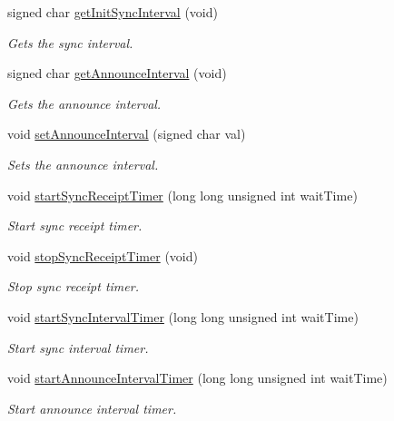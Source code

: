 \begin{DoxyCompactItemize}
signed char \hyperlink{class_common_port_af10585c4e9853d5a958933d5c5357445}{get\+Init\+Sync\+Interval} (void)
\begin{DoxyCompactList}\small\item\em Gets the sync interval. \end{DoxyCompactList}\item 
signed char \hyperlink{class_common_port_a7aa1a5fddf7129f600c97c018087b7b8}{get\+Announce\+Interval} (void)
\begin{DoxyCompactList}\small\item\em Gets the announce interval. \end{DoxyCompactList}\item 
void \hyperlink{class_common_port_a55a6b4ff487cd157501f921a27db0d9c}{set\+Announce\+Interval} (signed char val)
\begin{DoxyCompactList}\small\item\em Sets the announce interval. \end{DoxyCompactList}\item 
void \hyperlink{class_common_port_a25bf37b5026e4b86b138498915330656}{start\+Sync\+Receipt\+Timer} (long long unsigned int wait\+Time)
\begin{DoxyCompactList}\small\item\em Start sync receipt timer. \end{DoxyCompactList}\item 
void \hyperlink{class_common_port_af3b46893f10141406c791c89d3e54b8d}{stop\+Sync\+Receipt\+Timer} (void)
\begin{DoxyCompactList}\small\item\em Stop sync receipt timer. \end{DoxyCompactList}\item 
void \hyperlink{class_common_port_a2033d126c19548eb5ada2d623667e1f2}{start\+Sync\+Interval\+Timer} (long long unsigned int wait\+Time)
\begin{DoxyCompactList}\small\item\em Start sync interval timer. \end{DoxyCompactList}\item 
void \hyperlink{class_common_port_a3938df4f200087f96727e90805c543c9}{start\+Announce\+Interval\+Timer} (long long unsigned int wait\+Time)
\begin{DoxyCompactList}\small\item\em Start announce interval timer. \end{DoxyCompactList}\item 

\end{DoxyCompactItemize}
